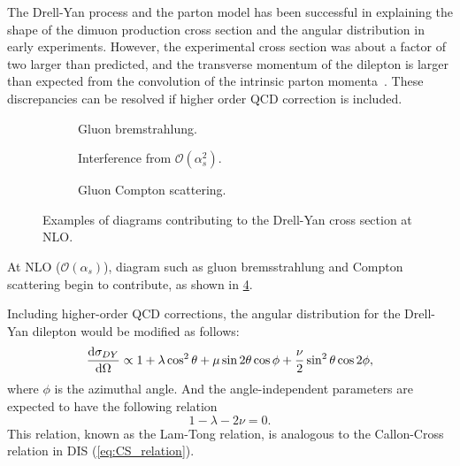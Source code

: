\documentclass[../main.tex]{subfiles}
\begin{document}
The Drell-Yan process and the parton model has been successful in explaining the shape of
the dimuon production cross section and the angular distribution in early experiments. However,
the  experimental cross section was about a factor of two larger than predicted, and the
transverse momentum of the dilepton is larger than expected from the convolution of the intrinsic
parton momenta~\cite{mcgaughey1999}. These discrepancies can be resolved if higher order
QCD correction is included.
\begin{figure}[htbp!]
	\centering
	\begin{subfigure}{0.45\linewidth}
		\centering
		
		\caption{Gluon bremstrahlung.}
		\label{subfig:DY_gb}
	\end{subfigure}
	\begin{subfigure}{0.45\linewidth}
		\centering
		
		\caption{Interference from $\mathcal{O}(\alpha^2_s)$.}
		\label{subfig:DY_interfer}
	\end{subfigure}

	\begin{subfigure}{\linewidth}
		\centering
		\begin{subfigure}{0.45\linewidth}
			\centering
			
		\end{subfigure}
		\begin{subfigure}{0.45\linewidth}
			\centering
			
		\end{subfigure}
		\caption{Gluon Compton scattering.}
		\label{subfig:DY_gc}
	\end{subfigure}
	\caption{Examples of diagrams contributing to the Drell-Yan cross section
		at NLO.}
	\label{fig:NLO_DY}
\end{figure}
At NLO ($\mathcal{O}\left(\alpha_s\right)$), diagram such as gluon bremsstrahlung
and Compton scattering begin to contribute, as shown in \cref{fig:NLO_DY}.



Including higher-order QCD corrections, the angular distribution for the Drell-Yan dilepton would
be modified as follows:
\begin{equation}
	\dv{\sigma_{DY}}{\Omega} \propto 1 + \lambda \cos^2\theta + \mu \sin 2\theta\cos\phi +\frac{\nu}{2}\sin^2\theta\cos 2\phi,
\end{equation}
where $\phi$ is the azimuthal angle. And the angle-independent parameters are expected to have the
following relation~\cite{lam1980}
\begin{equation}
	1-\lambda-2\nu=0.
\end{equation}
This relation, known as the Lam-Tong relation, is analogous to the Callon-Cross relation in DIS
(\cref{eq:CS_relation}).
\end{document}
